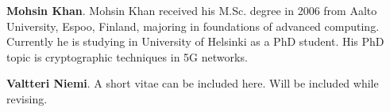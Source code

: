\documentclass{river-journal}
\begin{document}
\medskip
\noindent
{\bf Mohsin Khan}. Mohsin Khan received his M.Sc. degree in 2006 from Aalto University, Espoo, Finland, majoring in foundations of advanced computing. Currently he is studying in University of Helsinki as a PhD student. His PhD topic is cryptographic techniques in 5G networks.




\medskip
\noindent
{\bf Valtteri Niemi}. A short vitae can be included here. Will be included while revising.
\end{document}
